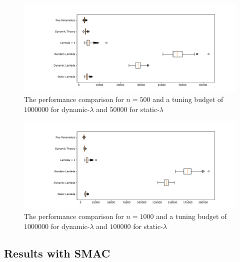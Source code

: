 \documentclass{article}
\newcommand{\smac}{\textsc{SMAC}\xspace}
\begin{document}
\begin{figure}[ht]
    \centering
        \includegraphics[width=1.0\textwidth]{box_plot_500_100_2000.pdf}
        \caption{The performance comparison for $n = 500$ and a tuning budget of $1000000$ for dynamic-$\lambda$ and $50000$ for static-$\lambda$}
        \label{box_plot_500_100_2000}
\end{figure}

\begin{figure}[ht]
    \centering
        \includegraphics[width=1.0\textwidth]{box_plot_1000_100_1000.pdf}
        \caption{The performance comparison for $n = 1000$ and a tuning budget of $1000000$ for dynamic-$\lambda$ and $100000$ for static-$\lambda$}
        \label{box_plot_1000_100_1000}
\end{figure}

\subsection{Results with \smac}
\end{document}
